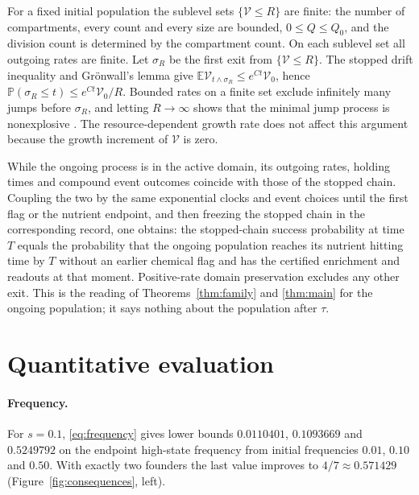 \documentclass[11pt,a4paper]{article}
\theoremstyle{plain}
\theoremstyle{definition}
\theoremstyle{remark}
\newcommand{\E}{\mathbb E}
\newcommand{\Prb}{\mathbb P}
\newcommand{\cV}{\mathcal V}
\begin{document}
For a fixed initial population the sublevel sets $\{\cV\leq R\}$ are finite: the number of compartments, every count and every size are bounded, $0\leq Q\leq Q_0$, and the division count is determined by the compartment count. On each sublevel set all outgoing rates are finite. Let $\sigma_R$ be the first exit from $\{\cV\leq R\}$. The stopped drift inequality and Gr\"onwall's lemma give $\E\cV_{t\wedge\sigma_R}\leq e^{Ct}\cV_0$, hence $\Prb(\sigma_R\leq t)\leq e^{Ct}\cV_0/R$. Bounded rates on a finite set exclude infinitely many jumps before $\sigma_R$, and letting $R\to\infty$ shows that the minimal jump process is nonexplosive \citep{ethierkurtz1986,norris1997,meyntweedie1993}. The resource-dependent growth rate does not affect this argument because the growth increment of $\cV$ is zero.

While the ongoing process is in the active domain, its outgoing rates, holding times and compound event outcomes coincide with those of the stopped chain. Coupling the two by the same exponential clocks and event choices until the first flag or the nutrient endpoint, and then freezing the stopped chain in the corresponding record, one obtains: the stopped-chain success probability at time $T$ equals the probability that the ongoing population reaches its nutrient hitting time by $T$ without an earlier chemical flag and has the certified enrichment and readouts at that moment. Positive-rate domain preservation excludes any other exit. This is the reading of Theorems~\ref{thm:family} and \ref{thm:main} for the ongoing population; it says nothing about the population after $\tau$.

\section{Quantitative evaluation}\label{sec:numbers}

\paragraph{Frequency.}
For $s=0.1$, \eqref{eq:frequency} gives lower bounds $0.0110401$, $0.1093669$ and $0.5249792$ on the endpoint high-state frequency from initial frequencies $0.01$, $0.10$ and $0.50$. With exactly two founders the last value improves to $4/7\approx0.571429$ (Figure~\ref{fig:consequences}, left).
\end{document}
